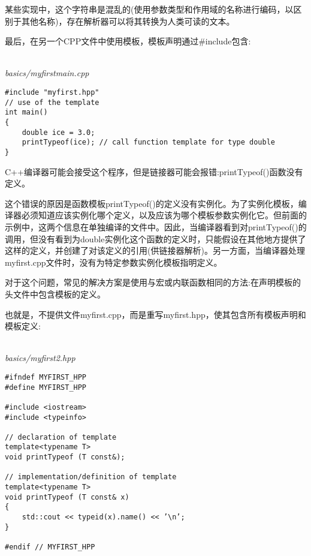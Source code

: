 \begin{tcolorbox}[colback=webgreen!5!white,colframe=webgreen!75!black]
\hspace*{0.75cm}某些实现中，这个字符串是混乱的(使用参数类型和作用域的名称进行编码，以区别于其他名称)，存在解析器可以将其转换为人类可读的文本。
\end{tcolorbox}

最后，在另一个CPP文件中使用模板，模板声明通过\#include包含:

\hspace*{\fill} \\ %
\noindent
\textit{basics/myfirstmain.cpp}
\begin{lstlisting}[style=styleCXX]
#include "myfirst.hpp"
// use of the template
int main()
{
	double ice = 3.0;
	printTypeof(ice); // call function template for type double
}
\end{lstlisting}

C++编译器可能会接受这个程序，但是链接器可能会报错:printTypeof()函数没有定义。

这个错误的原因是函数模板printTypeof()的定义没有实例化。为了实例化模板，编译器必须知道应该实例化哪个定义，以及应该为哪个模板参数实例化它。但前面的示例中，这两个信息在单独编译的文件中。因此，当编译器看到对printTypeof()的调用，但没有看到为double实例化这个函数的定义时，只能假设在其他地方提供了这样的定义，并创建了对该定义的引用(供链接器解析)。另一方面，当编译器处理myfirst.cpp文件时，没有为特定参数实例化模板指明定义。


对于这个问题，常见的解决方案是使用与宏或内联函数相同的方法:在声明模板的头文件中包含模板的定义。

也就是，不提供文件myfirst.cpp，而是重写myfirst.hpp，使其包含所有模板声明和模板定义:

\hspace*{\fill} \\ %
\noindent
\textit{basics/myfirst2.hpp}
\begin{lstlisting}[style=styleCXX]
#ifndef MYFIRST_HPP
#define MYFIRST_HPP

#include <iostream>
#include <typeinfo>

// declaration of template
template<typename T>
void printTypeof (T const&);

// implementation/definition of template
template<typename T>
void printTypeof (T const& x)
{
	std::cout << typeid(x).name() << ’\n’;
}

#endif // MYFIRST_HPP
\end{lstlisting}

